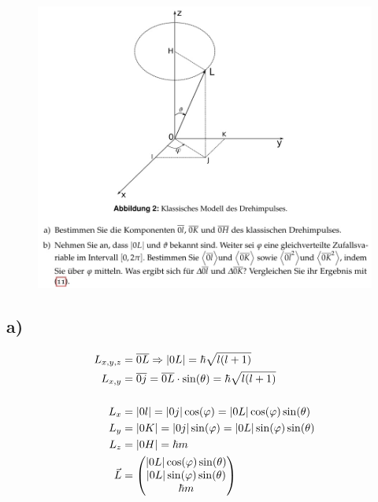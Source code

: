     \begin{figure}[H]
        \centering
        \includegraphics[width=\textwidth]{images/Aufgabe4b.jpg}
        \label{fig:9}
    \end{figure}

    \subsection{a)}

    \begin{align*}
        L_{x,y,z} &= \overline{0L} \Rightarrow \lvert0L\rvert = \hbar\sqrt{l(l+1)}\\
        L_{x,y} &= \overline{0j} = \overline{0L} \cdot \sin(\theta) = \hbar\sqrt{l(l+1)}\\
        \\
        L_x &= \lvert0l\rvert = \lvert0j\rvert \cos(\varphi) = \lvert0L\rvert\cos(\varphi)\sin(\theta)\\
        L_y &= \lvert0K\rvert = \lvert0j\rvert \sin(\varphi) = \lvert0L\rvert\sin(\varphi)\sin(\theta)\\
        L_z &= \lvert0H\rvert = \hbar m\\
        \vec{L} &= \begin{pmatrix}
            \lvert0L\rvert\cos(\varphi)\sin(\theta)\\
            \lvert0L\rvert\sin(\varphi)\sin(\theta)\\
            \hbar m
        \end{pmatrix}
    \end{align*}

